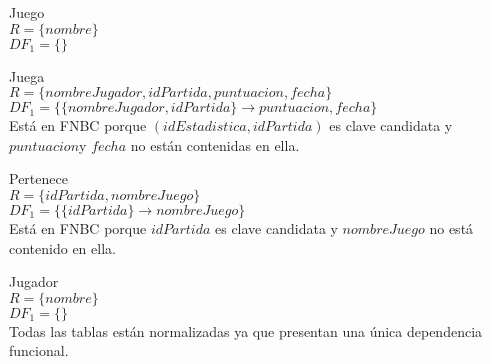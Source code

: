 \item{\large{Juego}} \\
$R = \{nombre \} $ \\
$DF_1 = \{\}$\\

\item{\large{Juega}} \\
$R = \{nombreJugador, idPartida, puntuacion,fecha \} $ \\
$DF_1 = \{ \{nombreJugador,idPartida \} \rightarrow puntuacion,fecha\}$ \\

Está en FNBC porque $(idEstadistica,idPartida)$ es clave candidata y $puntuacion$y $fecha$ no están contenidas en ella.

\item{\large{Pertenece}}\\
$R = \{idPartida,nombreJuego\} $\\
$DF_1 = \{ \{idPartida\} \rightarrow nombreJuego \}$\\
Está en FNBC porque $idPartida$ es clave candidata y $nombreJuego$ no está contenido en ella.

\item{\large{Jugador}}\\
$R = \{nombre\}$ \\
$ DF_1 = \{\} $ \\

Todas las tablas están normalizadas ya que presentan una única dependencia funcional.
